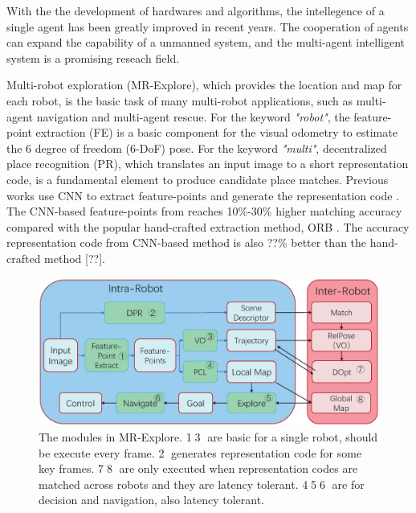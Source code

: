 \label{sec:intro}

With the the development of hardwares and algorithms, the intellegence of a single agent has been greatly improved in recent years. 
The cooperation of agents can expand the capability of a unmanned system, and the multi-agent intelligent system is a promising reseach field.

Multi-robot exploration (MR-Explore), which provides the location and map for each robot, is the basic task of many multi-robot applications, such as multi-agent navigation and multi-agent rescue. 
For the keyword \textit{"robot"}, the feature-point extraction (FE) is a basic component for the visual odometry to estimate the 6 degree of freedom (6-DoF) pose.
For the keyword \textit{"multi"}, decentralized place recognition (PR), which translates an input image to a short representation code, is a fundamental element to produce candidate place matches.
Previous works use CNN to extract feature-points \cite{detone2018superpoint, simo2015discriminative, yi2016lift} and generate the representation code \cite{arandjelovic2016netvlad, radenovic2018fine}. The CNN-based feature-points from \cite{detone2018superpoint} reaches 10\%-30\% higher matching accuracy compared with the popular hand-crafted extraction method, ORB \cite{Mur-Artal:2017281}. The accuracy representation code from CNN-based method \cite{radenovic2018fine} is also ??\% better than the hand-crafted method [??].

\begin{figure}
	\centering
	\includegraphics[width=0.99\linewidth]{fig/maexp.eps}
    \caption{
        The modules in MR-Explore. \textcircled{1}\textcircled{3} are basic for a single robot, should be execute every frame. \textcircled{2} generates representation code for some key frames. \textcircled{7}\textcircled{8} are only executed when representation codes are matched across robots and they are latency tolerant.  \textcircled{4}\textcircled{5}\textcircled{6} are for decision and navigation, also latency tolerant.
    }
	\label{fig:maexp}
\end{figure}

